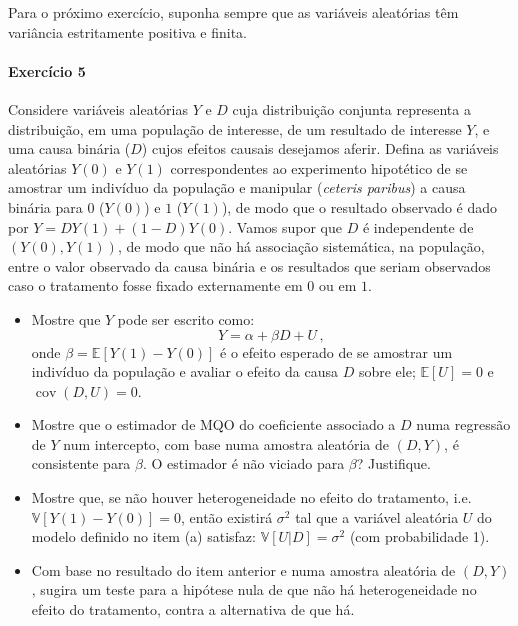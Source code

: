 \documentclass[10pt,a4paper]{article}
\begin{document}
 
 \vspace{1em}

		Para o próximo exercício, suponha sempre que as variáveis aleatórias têm variância estritamente positiva e finita.
			
 \paragraph{Exercício 5} Considere variáveis aleatórias $Y$ e $D$ cuja distribuição conjunta representa a distribuição, em uma população de interesse, de um resultado de interesse $Y$, e uma causa binária ($D$) cujos efeitos causais desejamos aferir. Defina as variáveis aleatórias $Y(0)$ e $Y(1)$ correspondentes ao experimento hipotético de se amostrar um indivíduo da população e manipular (\textit{ceteris paribus}) a causa binária para $0$ ($Y(0)$) e $1$ ($Y(1)$), de modo que o resultado observado é dado por $Y = DY(1)+(1-D)Y(0)$. Vamos supor que $D$ é independente de $(Y(0),Y(1))$, de modo que não há associação sistemática, na população, entre o valor observado da causa binária e os resultados que seriam observados caso o tratamento fosse fixado externamente em $0$ ou em $1$. 
 
 \begin{itemize}
 	\item[a] Mostre que $Y$ pode ser escrito como:
 	$$Y = \alpha + \beta D + U \, ,$$
 	onde $\beta = \mathbb{E}[Y(1)-Y(0)]$ é o efeito esperado de se amostrar um indivíduo da população e avaliar o efeito da causa $D$ sobre ele; $\mathbb{E}[U] =0$ e $\operatorname{cov}(D,U) =0$. 
 	\item[b]   Mostre que o estimador de MQO do coeficiente associado a $D$ numa regressão de $Y$ num intercepto, com base numa amostra aleatória de $(D,Y)$, é consistente para $\beta$. O estimador é não viciado para $\beta$? Justifique.
 	\item[c] Mostre que, se não houver heterogeneidade no efeito do tratamento, i.e. $\mathbb{V}[Y(1)-Y(0)]=0$, então existirá $\sigma^2$ tal que a variável aleatória $U$ do modelo definido no item (a) satisfaz: $\mathbb{V}[U|D] = \sigma^2$ (com probabilidade 1).
 	\item[d] Com base no resultado do item anterior e numa amostra aleatória de $(D,Y)$, sugira um teste para a hipótese nula de que não há heterogeneidade no efeito do tratamento, contra a alternativa de que há.
 \end{itemize}
 
 
 
 
\end{document}

